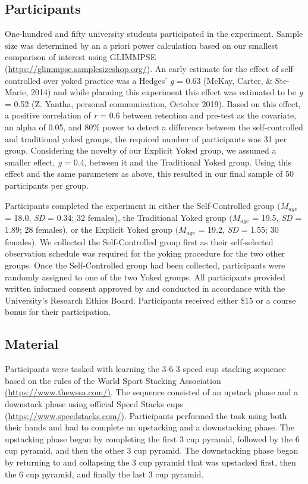 \documentclass[
  english,
  man, donotrepeattitle,floatsintext]{apa7}
\begin{document}
\hypertarget{participants}{%
\subsection{Participants}\label{participants}}

One-hundred and fifty university students participated in the experiment. Sample size was determined by an a priori power calculation based on our smallest comparison of interest using GLIMMPSE (\url{https://glimmpse.samplesizeshop.org/}). An early estimate for the effect of self-controlled over yoked practice was a Hedges' \emph{g} = 0.63 (McKay, Carter, \& Ste-Marie, 2014) and while planning this experiment this effect was estimated to be \emph{g} = 0.52 (Z. Yantha, personal communication, October 2019). Based on this effect, a positive correlation of \emph{r} = 0.6 between retention and pre-test as the covariate, an alpha of 0.05, and 80\% power to detect a difference between the self-controlled and traditional yoked groups, the required number of participants was 31 per group. Considering the novelty of our Explicit Yoked group, we assumed a smaller effect, \emph{g} = 0.4, between it and the Traditional Yoked group. Using this effect and the same parameters as above, this resulted in our final sample of 50 participants per group.

Participants completed the experiment in either the Self-Controlled group \((M_{age}\) = 18.0, \emph{SD} = 0.34; 32 females), the Traditional Yoked group \((M_{age}\) = 19.5, \emph{SD} = 1.89; 28 females), or the Explicit Yoked group \((M_{age}\) = 19.2, \emph{SD} = 1.55; 30 females). We collected the Self-Controlled group first as their self-selected observation schedule was required for the yoking procedure for the two other groups. Once the Self-Controlled group had been collected, participants were randomly assigned to one of the two Yoked groups. All participants provided written informed consent approved by and conducted in accordance with the University's Research Ethics Board. Participants received either \$15 or a course bonus for their participation.

\hypertarget{material}{%
\subsection{Material}\label{material}}

Participants were tasked with learning the 3-6-3 speed cup stacking sequence based on the rules of the World Sport Stacking Association \href{https://www.thewssa.com/}{(https://www.thewssa.com/)}. The sequence consisted of an upstack phase and a downstack phase using official Speed Stacks cups \href{https://www.speedstacks.com/}{(https://www.speedstacks.com/)}. Participants performed the task using both their hands and had to complete an upstacking and a downstacking phase. The upstacking phase began by completing the first 3 cup pyramid, followed by the 6 cup pyramid, and then the other 3 cup pyramid. The downstacking phase began by returning to and collapsing the 3 cup pyramid that was upstacked first, then the 6 cup pyramid, and finally the last 3 cup pyramid.
\end{document}
